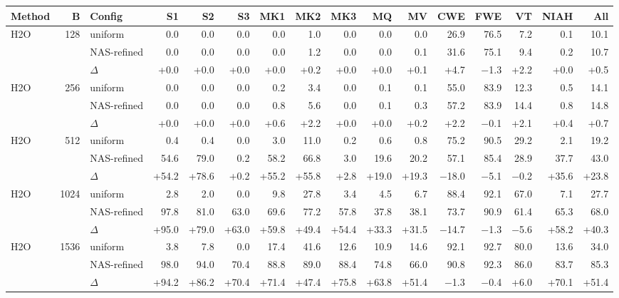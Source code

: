 \begin{table}[tp]
  \centering
  \scriptsize
  \setlength{\tabcolsep}{2.5pt}
  \begin{tabular}{@{}l r l r r r r r r r r r r r r r @{}}
    \toprule
    Method & B & Config & S1 & S2 & S3 & MK1 & MK2 & MK3 & MQ & MV & CWE & FWE & VT & NIAH & All \\
    \midrule
    H2O & 128 & uniform & 0.0 & 0.0 & 0.0 & 0.0 & 1.0 & 0.0 & 0.0 & 0.0 & 26.9 & 76.5 & 7.2 & 0.1 & 10.1 \\
     &  & NAS-refined & 0.0 & 0.0 & 0.0 & 0.0 & 1.2 & 0.0 & 0.0 & 0.1 & 31.6 & 75.1 & 9.4 & 0.2 & 10.7 \\
     &  & $\Delta$ & +0.0 & +0.0 & +0.0 & +0.0 & +0.2 & +0.0 & +0.0 & +0.1 & +4.7 & $-$1.3 & +2.2 & +0.0 & +0.5 \\
    \midrule
    H2O & 256 & uniform & 0.0 & 0.0 & 0.0 & 0.2 & 3.4 & 0.0 & 0.1 & 0.1 & 55.0 & 83.9 & 12.3 & 0.5 & 14.1 \\
     &  & NAS-refined & 0.0 & 0.0 & 0.0 & 0.8 & 5.6 & 0.0 & 0.1 & 0.3 & 57.2 & 83.9 & 14.4 & 0.8 & 14.8 \\
     &  & $\Delta$ & +0.0 & +0.0 & +0.0 & +0.6 & +2.2 & +0.0 & +0.0 & +0.2 & +2.2 & $-$0.1 & +2.1 & +0.4 & +0.7 \\
    \midrule
    H2O & 512 & uniform & 0.4 & 0.4 & 0.0 & 3.0 & 11.0 & 0.2 & 0.6 & 0.8 & 75.2 & 90.5 & 29.2 & 2.1 & 19.2 \\
     &  & NAS-refined & 54.6 & 79.0 & 0.2 & 58.2 & 66.8 & 3.0 & 19.6 & 20.2 & 57.1 & 85.4 & 28.9 & 37.7 & 43.0 \\
     &  & $\Delta$ & +54.2 & +78.6 & +0.2 & +55.2 & +55.8 & +2.8 & +19.0 & +19.3 & $-$18.0 & $-$5.1 & $-$0.2 & +35.6 & +23.8 \\
    \midrule
    H2O & 1024 & uniform & 2.8 & 2.0 & 0.0 & 9.8 & 27.8 & 3.4 & 4.5 & 6.7 & 88.4 & 92.1 & 67.0 & 7.1 & 27.7 \\
     &  & NAS-refined & 97.8 & 81.0 & 63.0 & 69.6 & 77.2 & 57.8 & 37.8 & 38.1 & 73.7 & 90.9 & 61.4 & 65.3 & 68.0 \\
     &  & $\Delta$ & +95.0 & +79.0 & +63.0 & +59.8 & +49.4 & +54.4 & +33.3 & +31.5 & $-$14.7 & $-$1.3 & $-$5.6 & +58.2 & +40.3 \\
    \midrule
    H2O & 1536 & uniform & 3.8 & 7.8 & 0.0 & 17.4 & 41.6 & 12.6 & 10.9 & 14.6 & 92.1 & 92.7 & 80.0 & 13.6 & 34.0 \\
     &  & NAS-refined & 98.0 & 94.0 & 70.4 & 88.8 & 89.0 & 88.4 & 74.8 & 66.0 & 90.8 & 92.3 & 86.0 & 83.7 & 85.3 \\
     &  & $\Delta$ & +94.2 & +86.2 & +70.4 & +71.4 & +47.4 & +75.8 & +63.8 & +51.4 & $-$1.3 & $-$0.4 & +6.0 & +70.1 & +51.4 \\

\end{tabular}
\end{table}
